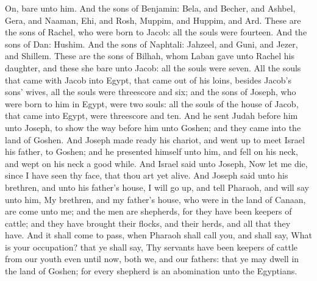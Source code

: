 On, bare unto him. And the sons of Benjamin: Bela, and Becher, and Ashbel, Gera, and Naaman, Ehi, and Rosh, Muppim, and Huppim, and Ard. These are the sons of Rachel, who were born to Jacob: all the souls were fourteen. And the sons of Dan: Hushim. And the sons of Naphtali: Jahzeel, and Guni, and Jezer, and Shillem. These are the sons of Bilhah, whom Laban gave unto Rachel his daughter, and these she bare unto Jacob: all the souls were seven. All the souls that came with Jacob into Egypt, that came out of his loins, besides Jacob’s sons’ wives, all the souls were threescore and six; and the sons of Joseph, who were born to him in Egypt, were two souls: all the souls of the house of Jacob, that came into Egypt, were threescore and ten.  And he sent Judah before him unto Joseph, to show the way before him unto Goshen; and they came into the land of Goshen. And Joseph made ready his chariot, and went up to meet Israel his father, to Goshen; and he presented himself unto him, and fell on his neck, and wept on his neck a good while. And Israel said unto Joseph, Now let me die, since I have seen thy face, that thou art yet alive. And Joseph said unto his brethren, and unto his father’s house, I will go up, and tell Pharaoh, and will say unto him, My brethren, and my father’s house, who were in the land of Canaan, are come unto me; and the men are shepherds, for they have been keepers of cattle; and they have brought their flocks, and their herds, and all that they have. And it shall come to pass, when Pharaoh shall call you, and shall say, What is your occupation? that ye shall say, Thy servants have been keepers of cattle from our youth even until now, both we, and our fathers: that ye may dwell in the land of Goshen; for every shepherd is an abomination unto the Egyptians. 

